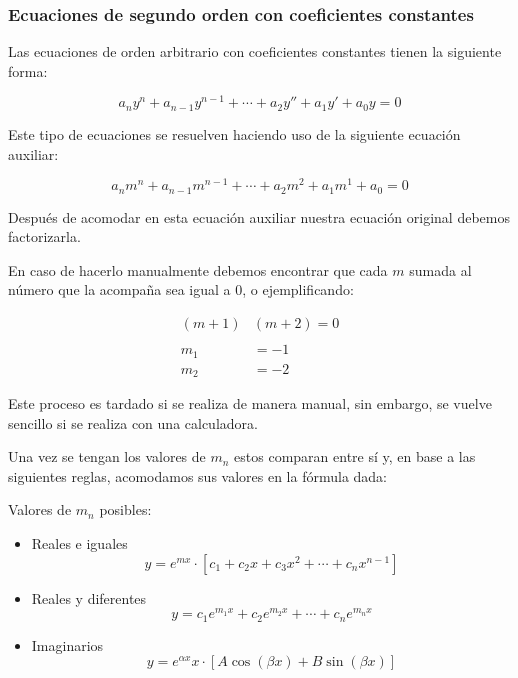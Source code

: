 \subsubsection{Ecuaciones de segundo orden con coeficientes constantes}

Las ecuaciones de orden arbitrario con coeficientes constantes tienen la siguiente forma:

\begin{equation*}
    a_{n}y^{n} + a_{n-1}y^{n-1} + \cdots + a_{2}y'' + a_{1}y' + a_{0}y = 0
\end{equation*}

Este tipo de ecuaciones se resuelven haciendo uso de la siguiente ecuación auxiliar:

\begin{equation*}
    a_{n}m^{n} + a_{n-1}m^{n-1} + \cdots + a_{2}m^{2} + a_{1}m^{1} + a_{0} = 0
\end{equation*}

Después de acomodar en esta ecuación auxiliar nuestra ecuación original debemos factorizarla.

En caso de hacerlo manualmente debemos encontrar que cada $m$ sumada al número que la acompaña sea igual a 0, o ejemplificando:

\begin{align*}
    (m+1)&(m+2)=0
    \\
    \\
    m_{1}&=-1
    \\
    m_{2}&=-2
\end{align*}

Este proceso es tardado si se realiza de manera manual, sin embargo, se vuelve sencillo si se realiza con una calculadora.


Una vez se tengan los valores de $m_{n}$ estos comparan entre sí y, en base a las siguientes reglas, acomodamos sus valores en la fórmula dada:

Valores de $m_{n}$ posibles:

\begin{itemize}
	\item Reales e iguales
	    \begin{equation*}
	        y = e^{mx} \cdot \left[ c_{1} + c_{2}x + c_{3}x^{2} + \cdots + c_{n}x^{n-1} \right]
	    \end{equation*}
	
	\item Reales y diferentes
	    \begin{equation*}
	        y = c_{1}e^{m_{1}x} + c_{2}e^{m_{2}x} + \cdots + c_{n}e^{m_{n}x}
	    \end{equation*}
	
	\item Imaginarios
	    \begin{equation*}
	        y = e^{\alpha x}x \cdot \left[ A \cos{(\beta x)} + B \sin{(\beta x)} \right]
	    \end{equation*}
	
\end{itemize}

